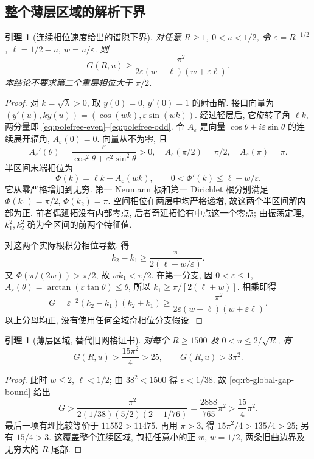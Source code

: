 \documentclass[UTF8]{ctexart}
\newtheorem{lemma}[theorem]{引理}
\begin{document}
\subsection{整个薄层区域的解析下界}\label{sec:sliver}
\begin{lemma}[连续相位速度给出的谱隙下界]\label{lem:r8-phase-speed}
对任意 $R\ge1$, $0<u<1/2$, 令 $\varepsilon=R^{-1/2}$,
$\ell=1/2-u$, $w=u/\varepsilon$. 则
\begin{equation}
 G(R,u)\ge\frac{\pi^2}{2\varepsilon(w+\ell)(w+\varepsilon\ell)}.
 \label{eq:r8-global-gap-bound}
\end{equation}
本结论不要求第二个重层相位大于 $\pi/2$.
\end{lemma}
\begin{proof}
对 $k=\sqrt\lambda>0$, 取 $y(0)=0$, $y'(0)=1$ 的射击解.
接口向量为 $(y'(u),ky(u))=(\cos(wk),\varepsilon\sin(wk))$.
经过轻层后, 它旋转了角 $\ell k$, 两分量即 \eqref{eq:polefree-even}--\eqref{eq:polefree-odd}.
令 $A_\varepsilon$ 是向量 $\cos\theta+i\varepsilon\sin\theta$ 的连续展开辐角,
$A_\varepsilon(0)=0$. 向量从不为零, 且
\[
 A_\varepsilon'(\theta)=\frac{\varepsilon}{\cos^2\theta+\varepsilon^2\sin^2\theta}>0,
 \quad A_\varepsilon(\pi/2)=\pi/2,\quad A_\varepsilon(\pi)=\pi.
\]
半区间末端相位为
\[
 \Phi(k)=\ell k+A_\varepsilon(wk),\qquad
 0<\Phi'(k)\le\ell+w/\varepsilon.
\]
它从零严格增加到无穷. 第一 Neumann 根和第一 Dirichlet 根分别满足
$\Phi(k_1)=\pi/2$, $\Phi(k_2)=\pi$.
空间相位在两层中均严格递增, 故这两个半区间解内部为正.
前者偶延拓没有内部零点, 后者奇延拓恰有中点这一个零点;
由振荡定理, $k_1^2,k_2^2$ 确为全区间的前两个特征值.

对这两个实际根积分相位导数, 得
\[
 k_2-k_1\ge\frac{\pi}{2(\ell+w/\varepsilon)}.
\]
又 $\Phi(\pi/(2w))>\pi/2$, 故 $wk_1<\pi/2$.
在第一分支, 因 $0<\varepsilon\le1$,
$A_\varepsilon(\theta)=\arctan(\varepsilon\tan\theta)\le\theta$,
所以 $k_1\ge\pi/[2(\ell+w)]$.
相乘即得
\[
 G=\varepsilon^{-2}(k_2-k_1)(k_2+k_1)
 \ge\frac{\pi^2}{2\varepsilon(w+\ell)(w+\varepsilon\ell)}.
\]
以上分母均正, 没有使用任何全域奇相位分支假设.
\end{proof}

\begin{lemma}[薄层区域, 替代旧网格证书]\label{lem:sliver}
对每个 $R\ge1500$ 及 $0<u\le2/\sqrt R$, 有
\begin{equation}
 G(R,u)>\frac{15\pi^2}{4}>25,\qquad G(R,u)>3\pi^2.
 \label{eq:r8-sliver-margin}
\end{equation}
\end{lemma}
\begin{proof}
此时 $w\le2$, $\ell<1/2$; 由 $38^2<1500$ 得 $\varepsilon<1/38$.
故 \eqref{eq:r8-global-gap-bound} 给出
\[
 G>\frac{\pi^2}{2(1/38)(5/2)(2+1/76)}
 =\frac{2888}{765}\pi^2>\frac{15}{4}\pi^2.
\]
最后一项有理比较等价于 $11552>11475$.
再用 $\pi>3$, 得 $15\pi^2/4>135/4>25$; 另有 $15/4>3$.
这覆盖整个连续区域, 包括任意小的正 $w$, $w=1/2$, 两条旧曲边界及无穷大的 $R$ 尾部.
\end{proof}
\end{document}

